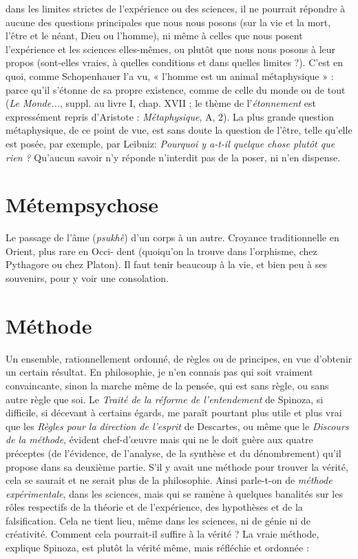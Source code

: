 dans les limites strictes de l'expérience ou des sciences, il ne pourrait répondre
à aucune des questions principales que nous nous posons (sur la vie et la mort,
l'être et le néant, Dieu ou l’homme), ni même à celles que nous posent l’expérience
et les sciences elles-mêmes, ou plutôt que nous nous posons à leur
propos (sont-elles vraies, à quelles conditions et dans quelles limites ?). C’est en
quoi, comme Schopenhauer l’a vu, « l’homme est un animal métaphysique » :
parce qu’il s'étonne de sa propre existence, comme de celle du monde ou de
tout ({\it Le Monde...}, suppl. au livre I, chap. XVII ; le thème de l’{\it étonnement} est
expressément repris d’Aristote : {\it Métaphysique}, A, 2). La plus grande question
métaphysique, de ce point de vue, est sans doute la question de l’être, telle
qu’elle est posée, par exemple, par Leibniz: {\it Pourquoi y a-t-il quelque chose
plutôt que rien ?} Qu’aucun savoir n’y réponde n’interdit pas de la poser, ni n’en
dispense.

\section{Métempsychose}
Le passage de l’âme ({\it psukhè}) d’un corps à un autre.
Croyance traditionnelle en Orient, plus rare en Occi-
dent (quoiqu’on la trouve dans l’orphisme, chez Pythagore ou chez Platon). Il
faut tenir beaucoup à la vie, et bien peu à ses souvenirs, pour y voir une consolation.

\section{Méthode}
Un ensemble, rationnellement ordonné, de règles ou de principes,
en vue d'obtenir un certain résultat. En philosophie, je
n’en connais pas qui soit vraiment convaincante, sinon la marche même de la
pensée, qui est sans règle, ou sans autre règle que soi. Le {\it Traité de la réforme de
l'entendement} de Spinoza, si difficile, si décevant à certains égards, me paraît
pourtant plus utile et plus vrai que les {\it Règles pour la direction de l'esprit} de Descartes,
ou même que le {\it Discours de la méthode}, évident chef-d'œuvre mais qui
ne le doit guère aux quatre préceptes (de l'évidence, de l’analyse, de la synthèse
et du dénombrement) qu’il propose dans sa deuxième partie. S’il y avait une
méthode pour trouver la vérité, cela se saurait et ne serait plus de la philosophie.
Ainsi parle-t-on de {\it méthode expérimentale}, dans les sciences, mais qui se
ramène à quelques banalités sur les rôles respectifs de la théorie et de l’expérience,
des hypothèses et de la falsification. Cela ne tient lieu, même dans les
sciences, ni de génie ni de créativité. Comment cela pourrait-il suffire à la
vérité ? La vraie méthode, explique Spinoza, est plutôt la vérité même, mais
réfléchie et ordonnée :

